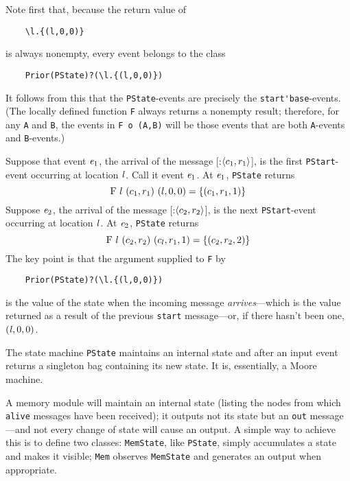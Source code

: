 \documentclass[final]{article}
\newcommand{\listinline}[1]{\text{\lstinline{#1}}}
\newcommand{\MSG}[2]{[\listinline{#1}:#2]}
\begin{document}
\noindent Note first that, because the return value of
\begin{lstlisting}
    \l.{(l,0,0)}
\end{lstlisting}
is always nonempty, every event belongs to the class
\begin{lstlisting}
    Prior(PState)?(\l.{(l,0,0)})
\end{lstlisting}
It follows from this that the \lstinline{PState}-events are precisely
the \lstinline{start'base}-events.  (The locally defined function
\lstinline{F} always returns a nonempty result; therefore, for any
\lstinline{A} and \lstinline{B}, the events in \lstinline{F o (A,B)} will
be those events that are both \lstinline{A}-events and
\lstinline{B}-events.)

Suppose that event $\mathit{e}_1$, the arrival of the message
\MSG{start}{$\langle c_1,r_1\rangle$},  is the
first \lstinline{PStart}-event occurring at location $\mathit{l}$.
Call it event $\mathit{e}_1$.  At $\mathit{e}_1$, \lstinline{PState}
returns
\[
    \listinline{F}~l~(c_1,r_1)~(l,0,0) = \{(c_1,r_1,1)\}
\]
Suppose $\mathit{e}_2$, the arrival of the message
\MSG{start}{$\langle c_2,r_2\rangle$}, is the next
\lstinline{PStart}-event occurring at location $\mathit{l}$.  At
$\mathit{e}_2$, \lstinline{PState} returns
\[
    \listinline{F}~l~(c_2,r_2)~(c_l,r_1,1) = \{(c_2,r_2,2)\}
\]
The key point is that the argument supplied to \lstinline{F} by
\begin{lstlisting}
    Prior(PState)?(\l.{(l,0,0)})
\end{lstlisting}
is the value of the state when the incoming message
\emph{arrives}---which is the value returned as a result of the
previous \lstinline{start} message---or, if there hasn't been one,
$(\mathit{l},0,0)$.


The state machine \lstinline{PState} maintains an internal state and
after an input event returns a singleton bag containing its new
state.  It is, essentially, a Moore machine.

A memory module will maintain an internal state (listing the nodes
from which \lstinline{alive} messages have been received); it outputs
not its state but an \lstinline{out} message---and not every change of
state will cause an output.  A simple way to achieve this is to define
two classes: \lstinline{MemState}, like \lstinline{PState}, simply
accumulates a state and makes it visible; \lstinline{Mem} observes
\lstinline{MemState} and generates an output when appropriate.
\end{document}
